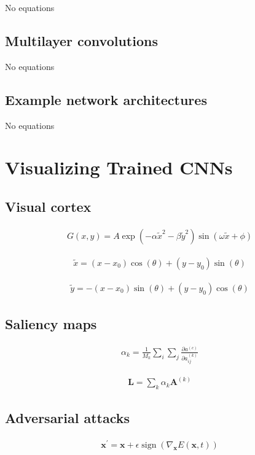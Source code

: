 \documentclass{article}
\begin{document}
No equations

\subsection{Multilayer convolutions}

No equations

\subsection{Example network architectures}

No equations

\section{Visualizing Trained CNNs}

\subsection{Visual cortex}
\begin{align*}
G(x, y) = A \exp \left(-\alpha \widetilde{x}^{2} - \beta \widetilde{y}^{2}\right) \sin (\omega \widetilde{x} + \phi) \tag{10.6}
\end{align*}

\begin{align*}
\widetilde{x} = \left(x - x_{0}\right) \cos (\theta) + \left(y - y_{0}\right) \sin (\theta) \tag{10.7}
\end{align*}

\begin{align*}
\widetilde{y} = -\left(x - x_{0}\right) \sin (\theta) + \left(y - y_{0}\right) \cos (\theta) \tag{10.8}
\end{align*}

\subsection{Saliency maps}
\begin{align*}
\alpha_{k} = \frac{1}{M_{k}} \sum_{i} \sum_{j} \frac{\partial a^{(c)}}{\partial a_{i j}^{(k)}} \tag{10.9}
\end{align*}

\begin{align*}
\mathbf{L} = \sum_{k} \alpha_{k} \mathbf{A}^{(k)} \tag{10.10}
\end{align*}

\subsection{Adversarial attacks}
\begin{align*}
\mathbf{x}^{\prime} = \mathbf{x} + \epsilon \operatorname{sign} \left(\nabla_{\mathbf{x}} E(\mathbf{x}, t)\right) \tag{10.11}
\end{align*}
\end{document}

